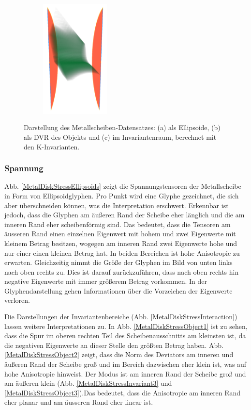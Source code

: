 \documentclass[a4paper,fontsize=12pt,toc=bib,halfparskip]{scrartcl}
\begin{document}
\begin{figure}
\begin{subfigure}{0.3\textwidth}
		\centering
		\includegraphics[height=6cm]{pictures/results/MetalDiskStress_InvariantSpace.png}
		\subcaption{}
		\label{MetalDiskStressInvariantSpace}
	\end{subfigure}
	\caption{Darstellung des Metallscheiben-Datensatzes: (a) als Ellipsoide, (b) als DVR des Objekts und (c) im Invariantenraum, berechnet mit den K-Invarianten.}
	\label{MetalDiskStress}
\end{figure}

\subsubsection{Spannung}
Abb. \ref{MetalDiskStressEllipsoids} zeigt die Spannungstensoren der Metallscheibe in Form von Ellipsoidglyphen. Pro Punkt wird eine Glyphe gezeichnet, die sich aber \"uberschneiden k\"onnen, was die Interpretation erschwert. Erkennbar ist jedoch, dass die Glyphen am \"au{\ss}eren Rand der Scheibe eher l\"anglich und die am inneren Rand eher scheibenf\"ormig sind. Das bedeutet, dass die Tensoren am \"ausseren Rand einen einzelnen Eigenwert mit hohem und zwei Eigenwerte mit kleinem Betrag besitzen, wogegen am inneren Rand zwei Eigenwerte hohe und nur einer einen kleinen Betrag hat. In beiden Bereichen ist hohe Anisotropie zu erwarten. Gleichzeitig nimmt die Gr\"o{\ss}e der Glyphen im Bild von unten links nach oben rechts zu. Dies ist darauf zur\"uckzuf\"uhren, dass nach oben rechts hin negative Eigenwerte mit immer gr\"o{\ss}erem Betrag vorkommen. In der Glyphendarstellung gehen Informationen \"uber die Vorzeichen der Eigenwerte verloren.

Die Darstellungen der Invariantenbereiche (Abb. \ref{MetalDiskStressInteraction}) lassen weitere Interpretationen zu. In Abb. \ref{MetalDiskStressObject1} ist zu sehen, dass die Spur im oberen rechten Teil des Scheibenausschnitts am kleinsten ist, da die negativen Eigenwerte an dieser Stelle den gr\"o{\ss}ten Betrag haben.  Abb. \ref{MetalDiskStressObject2} zeigt, dass die Norm des Deviators am inneren und \"au{\ss}eren Rand der Scheibe gro{\ss} und im Bereich dazwischen eher klein ist, was auf hohe Anisotropie hinweist. Der Modus ist am inneren Rand der Scheibe gro{\ss} und am \"au{\ss}eren klein (Abb. \ref{MetalDiskStressInvariant3} und \ref{MetalDiskStressObject3}).Das bedeutet, dass die Anisotropie am inneren Rand eher planar und am \"ausseren Rand eher linear ist.
\end{document}
